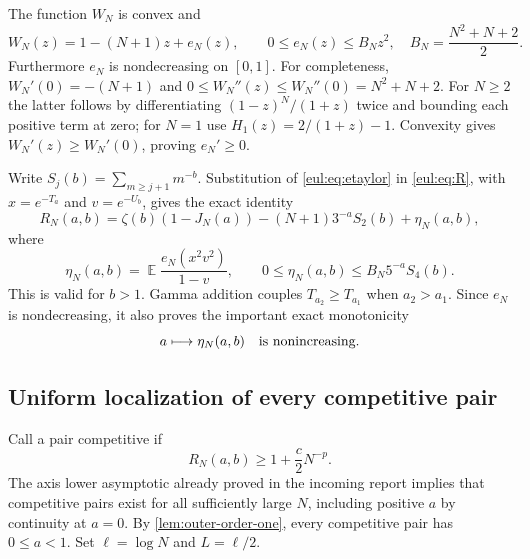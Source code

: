 \documentclass[11pt]{article}
\numberwithin{equation}{section}
\theoremstyle{definition}
\theoremstyle{remark}
\DeclareMathOperator{\E}{\mathbb E}
\begin{document}
The function $W_N$ is convex and
\begin{equation}\label{eul:eq:etaylor}
 W_N(z)=1-(N+1)z+e_N(z),\qquad
 0\leq e_N(z)\leq B_Nz^2,
 \quad B_N=\frac{N^2+N+2}{2}.
\end{equation}
Furthermore $e_N$ is nondecreasing on $[0,1]$.
For completeness, $W_N'(0)=-(N+1)$ and
$0\leq W_N''(z)\leq W_N''(0)=N^2+N+2$.
For $N\geq2$ the latter follows by differentiating
$(1-z)^N/(1+z)$ twice and bounding each positive term at zero;
for $N=1$ use $H_1(z)=2/(1+z)-1$.
Convexity gives $W_N'(z)\geq W_N'(0)$, proving $e_N'\geq0$.

Write $S_j(b)=\sum_{m\geq j+1}m^{-b}$.  Substitution of
\eqref{eul:eq:etaylor} in \eqref{eul:eq:R}, with $x=e^{-T_a}$ and
$v=e^{-U_b}$, gives the exact identity
\begin{equation}\label{eul:eq:exactexpansion}
 R_N(a,b)=\zeta(b)(1-J_N(a))
 -(N+1)3^{-a}S_2(b)+\eta_N(a,b),
\end{equation}
where
\begin{equation}\label{eul:eq:eta}
 \eta_N(a,b)=\E\frac{e_N(x^2v^2)}{1-v},\qquad
 0\leq\eta_N(a,b)\leq B_N5^{-a}S_4(b).
\end{equation}
This is valid for $b>1$.  Gamma addition couples $T_{a_2}\geq T_{a_1}$
when $a_2>a_1$.  Since $e_N$ is nondecreasing, it also proves the
important exact monotonicity
\begin{equation}\label{eul:eq:etamonotone}
 a\longmapsto\eta_N(a,b)\quad\hbox{is nonincreasing}.
\end{equation}

\subsection{Uniform localization of every competitive pair}
Call a pair competitive if
\begin{equation}\label{eul:eq:competitive}
 R_N(a,b)\geq1+\frac c2N^{-p}.
\end{equation}
The axis lower asymptotic already proved in the incoming report implies
that competitive pairs exist for all sufficiently large $N$, including
positive $a$ by continuity at $a=0$.
By \cref{lem:outer-order-one}, every competitive pair has $0\leq a<1$.
Set $\ell=\log N$ and $L=\ell/2$.
\end{document}
